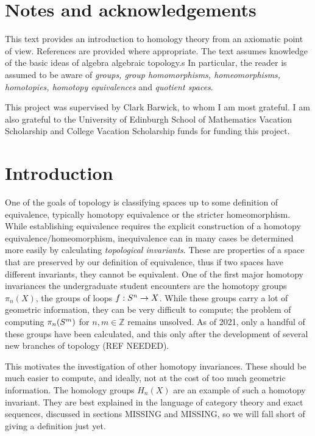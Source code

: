 \section{Notes and acknowledgements}
This text provides an introduction to homology theory from an axiomatic point of view. References are provided where appropriate. The text assumes knowledge of the basic ideas of algebra algebraic topology.s In particular, the reader is assumed to be aware of \textit{groups, group homomorphisms, homeomorphisms, homotopies, homotopy equivalences} and \textit{quotient spaces}.

This project was supervised by Clark Barwick, to whom I am most grateful. I am also grateful to the University of Edinburgh School of Mathematics Vacation Scholarship and College Vacation Scholarship funds for funding this project.

\section{Introduction}
One of the goals of topology is classifying spaces up to some definition of equivalence, typically homotopy equivalence or the stricter homeomorphism. While establishing equivalence requires the explicit construction of a homotopy equivalence/homeomorphism, inequivalence can in many cases be determined more easily by calculating \textit{topological invariants}. These are properties of a space that are preserved by our definition of equivalence, thus if two spaces have different invariants, they cannot be equivalent. One of the first major homotopy invariances the undergraduate student encounters are the homotopy groups $\pi_n(X)$, the groups of loops $f:\S{n}\rightarrow X$. While these groups carry a lot of geometric information, they can be very difficult to compute; the problem of computing $\pi_n(\S{m})$ for $n,m\in \mathbb{Z}$ remains unsolved. As of 2021, only a handful of these groups have been calculated, and this only after the development of several new branches of topology (REF NEEDED).

This motivates the investigation of other homotopy invariances. These should be much easier to compute, and ideally, not at the cost of too much geometric information. The homology groups $H_n(X)$ are an example of such a homotopy invariant. They are best explained in the language of category theory and exact sequences, discussed in sections MISSING and MISSING, so we will fall short of giving a definition just yet.

